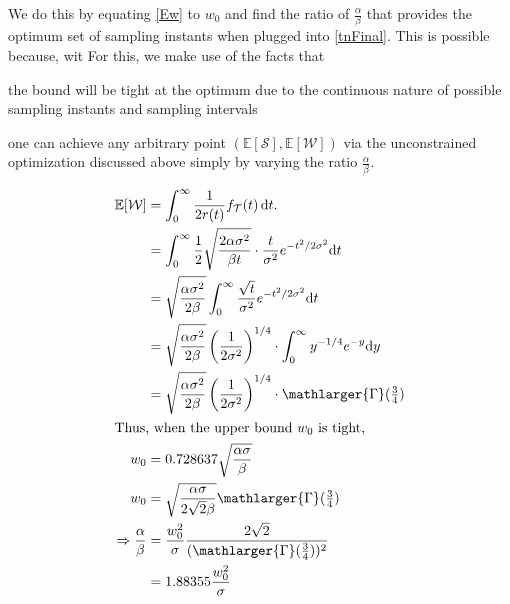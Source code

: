 We do this by equating \cref{Ew} to $w_0$ and find the ratio of $\frac{\alpha}{\beta}$ that provides the optimum set of sampling instants when plugged into \cref{tnFinal}. This is possible because, wit
For this, we make use of the facts that
\begin{enumerate*}[itemjoin={{, }}, itemjoin*={{, and }}]
    \item the bound will be tight at the optimum due to the continuous nature of possible sampling instants and sampling intervals
    \item one can achieve any arbitrary point $(\mathbb{E}[\mathcal{S}],\mathbb{E}[\mathcal{W}])$ via the unconstrained optimization discussed above simply by varying the ratio $\frac{\alpha}{\beta}$.
\end{enumerate*}
\begin{alignat*}{1}
\mathbb{E}[\mathcal{W}]&=\int_{0}^{\infty}\dfrac{1}{2r(t)}f_\mathcal{T}(t)\,\mathrm{d}t.\nonumber\\
&=\int_{0}^{\infty}\frac{1}{2}\sqrt{\frac{2\alpha\sigma^2}{\beta t}}\cdot \frac{t}{\sigma^2}e^{-{t^2}/{2\sigma^2}}\mathrm{d}t\\
&=\sqrt{\frac{\alpha\sigma^2}{2\beta}}\int_{0}^{\infty}\frac{\sqrt{t}}{\sigma^2}e^{-{t^2}/{2\sigma^2}}\mathrm{d}t\\
&=\sqrt{\frac{\alpha\sigma^2}{2\beta}}\left({\frac{1}{{2}\sigma^2}}\right)^{1/4}\cdot\int_{0}^{\infty}y^{-1/4}e^{-y}\mathrm{d}y\\
&=\sqrt{\frac{\alpha\sigma^2}{2\beta}}\left({\frac{1}{{2}\sigma^2}}\right)^{1/4}\cdot\mathlarger{\Gamma}(\tfrac{3}{4})\\
\intertext{Thus, when the upper bound $w_0$ is tight,}
w_0&=0.728637\sqrt{\frac{\alpha\sigma}{\beta}}\\
w_0&=\sqrt{\frac{\alpha\sigma}{2\sqrt{2}\beta}}\mathlarger{\Gamma}(\tfrac{3}{4})\\
\Rightarrow\frac{\alpha}{\beta}&=\frac{w_0^2}{\sigma}\frac{2\sqrt{2}}{(\mathlarger{\Gamma}(\tfrac{3}{4}))^2}\\&=1.88355\frac{w_0^2}{\sigma}
\end{alignat*}

